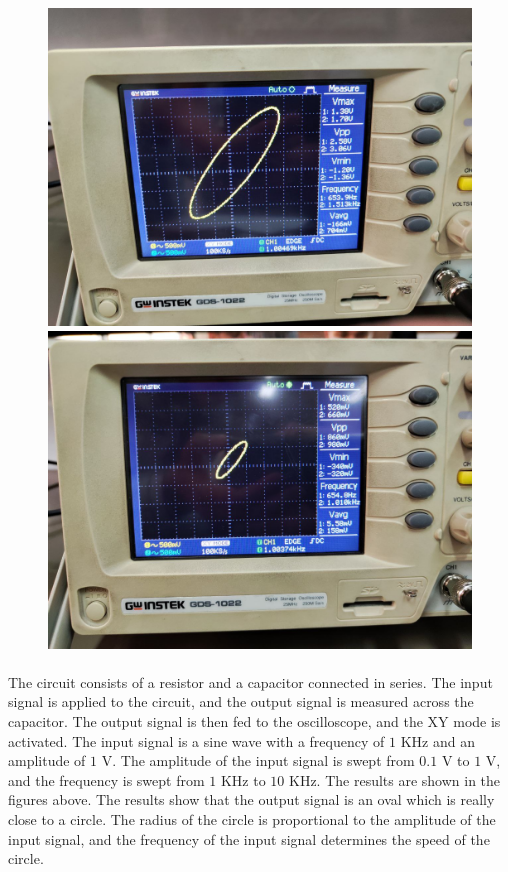 \documentclass[11pt]{article}
\begin{document}
\begin{question}
{\begin{figure}[H]
\begin{center}
                \includegraphics[scale=0.15]{Fig/77.jpeg}
                \includegraphics[scale=0.15]{Fig/78.jpeg}
            \end{center}
        \end{figure}

        \paragraph*{}
        The circuit consists of a resistor and a capacitor connected in series. The input signal is applied to the circuit, and the output signal is measured across the capacitor. The output signal is then fed to the oscilloscope, and the XY mode is activated.
        The input signal is a sine wave with a frequency of $1$ KHz and an amplitude of $1$ V.
        The amplitude of the input signal is swept from $0.1$ V to $1$ V, and the frequency is swept
        from $1$ KHz to $10$ KHz. The results are shown in the figures above.
        The results show that the output signal is an oval which is really close to a circle.
        The radius of the circle is proportional
        to the amplitude of the input signal, and the frequency of the input signal determines the speed of the circle.

    }

\end{question}
\end{document}
